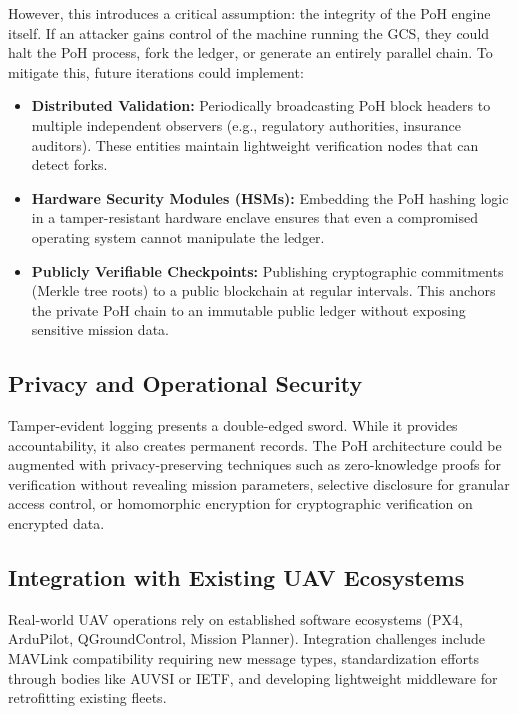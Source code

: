 \documentclass[preprint,12pt]{elsarticle}
\begin{document}
However, this introduces a critical assumption: the integrity of the PoH engine itself. If an attacker gains control of the machine running the GCS, they could halt the PoH process, fork the ledger, or generate an entirely parallel chain. To mitigate this, future iterations could implement:

\begin{itemize}
    \item \textbf{Distributed Validation:} Periodically broadcasting PoH block headers to multiple independent observers (e.g., regulatory authorities, insurance auditors). These entities maintain lightweight verification nodes that can detect forks.
    \item \textbf{Hardware Security Modules (HSMs):} Embedding the PoH hashing logic in a tamper-resistant hardware enclave ensures that even a compromised operating system cannot manipulate the ledger.
    \item \textbf{Publicly Verifiable Checkpoints:} Publishing cryptographic commitments (Merkle tree roots) to a public blockchain at regular intervals. This anchors the private PoH chain to an immutable public ledger without exposing sensitive mission data.
\end{itemize}

\subsection{Privacy and Operational Security}

Tamper-evident logging presents a double-edged sword. While it provides accountability, it also creates permanent records. The PoH architecture could be augmented with privacy-preserving techniques such as zero-knowledge proofs for verification without revealing mission parameters, selective disclosure for granular access control, or homomorphic encryption for cryptographic verification on encrypted data.

\subsection{Integration with Existing UAV Ecosystems}

Real-world UAV operations rely on established software ecosystems (PX4, ArduPilot, QGroundControl, Mission Planner). Integration challenges include MAVLink compatibility requiring new message types, standardization efforts through bodies like AUVSI or IETF, and developing lightweight middleware for retrofitting existing fleets.
\end{document}
